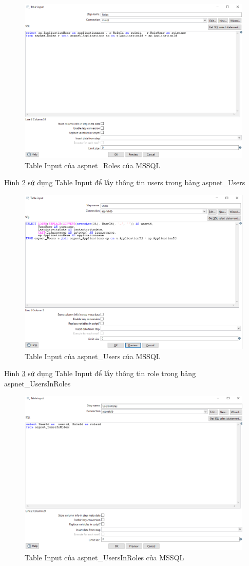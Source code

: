 \documentclass[14pt]{article}
\begin{document}
\begin{figure}
    \centering
    \includegraphics[width=0.8\linewidth]{images/roles.png}
    \caption{Table Input của aspnet\_Roles của MSSQL}
    \label{fig:roles}
\end{figure}

Hình \ref{fig:usersl} sử dụng Table Input để lấy thông tin users trong bảng aspnet\_Users

\begin{figure}
    \centering
    \includegraphics[width=0.5\linewidth]{images/users.png}
    \caption{Table Input của aspnet\_Users của MSSQL}
    \label{fig:usersl}
\end{figure}

Hình \ref{fig:UsersInRoles} sử dụng Table Input để lấy thông tin role trong bảng aspnet\_UsersInRoles

\begin{figure}
    \centering
    \includegraphics[width=0.5\linewidth]{images/UsersInRoles.png}
    \caption{Table Input của aspnet\_UsersInRoles của MSSQL}
    \label{fig:UsersInRoles}
\end{figure}
\end{document}
